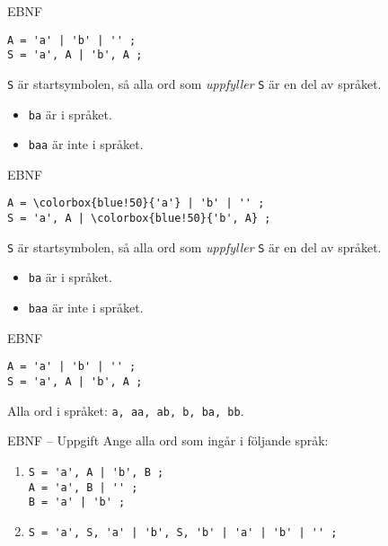 \documentclass{beamer}
\begin{document}
  \begin{frame}[fragile]{EBNF}
    \begin{Verbatim}[commandchars=\\\{\}]
A = 'a' | 'b' | '' ;
S = 'a', A | 'b', A ;
    \end{Verbatim}

    \texttt{S} är startsymbolen, så alla ord som \emph{uppfyller} \texttt{S} är
    en del av språket.

    \begin{itemize}
      \item \texttt{ba} är i språket.
      \item \texttt{baa} är inte i språket.
    \end{itemize}

  \end{frame}

  \begin{frame}[fragile]{EBNF}
    \begin{Verbatim}[commandchars=\\\{\}]
A = \colorbox{blue!50}{'a'} | 'b' | '' ;
S = 'a', A | \colorbox{blue!50}{'b', A} ;
    \end{Verbatim}

    \texttt{S} är startsymbolen, så alla ord som \emph{uppfyller} \texttt{S} är
    en del av språket.

    \begin{itemize}
      \item \texttt{ba} är i språket.
      \item \texttt{baa} är inte i språket.
    \end{itemize}

  \end{frame}

  \begin{frame}[fragile]{EBNF}
    \begin{Verbatim}[commandchars=\\\{\}]
A = 'a' | 'b' | '' ;
S = 'a', A | 'b', A ;
    \end{Verbatim}

    Alla ord i språket: \texttt{a, aa, ab, b, ba, bb}.
  \end{frame}

  \begin{frame}[fragile]{EBNF -- Uppgift}
    Ange alla ord som ingår i följande språk:

    \begin{enumerate}
      \item \begin{Verbatim}
S = 'a', A | 'b', B ;
A = 'a', B | '' ;
B = 'a' | 'b' ;
      \end{Verbatim}
      \item \begin{Verbatim}
S = 'a', S, 'a' | 'b', S, 'b' | 'a' | 'b' | '' ;
      \end{Verbatim}
    \end{enumerate}

  \end{frame}
\end{document}
